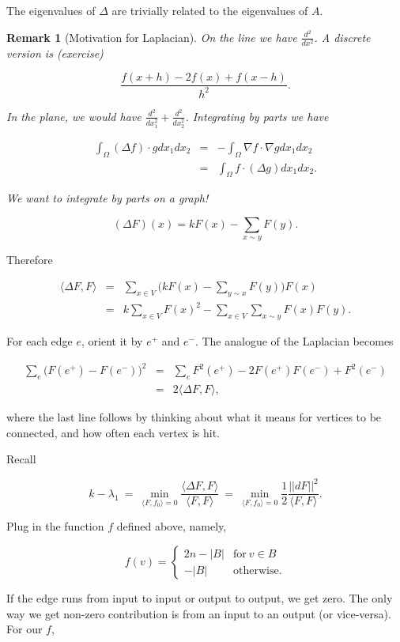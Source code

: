\documentclass[12pt,letterpaper]{report}
\newcommand\be{\begin{equation}}
\newcommand\ee{\end{equation}}
\newcommand\bea{\begin{eqnarray}}
\newcommand\eea{\end{eqnarray}}
\newcommand{\foh}{\frac{1}{2}}  %
\newtheorem{rek}[thm]{Remark}
\begin{document}
The eigenvalues of $\Delta$ are trivially related to the
eigenvalues of $A$.

\begin{rek}[Motivation for Laplacian] On the line we have
$\frac{d^2}{dx^2}$. A discrete version is (exercise)

\be \frac{ f(x+h) - 2f(x) + f(x-h) }{h^2}. \ee

In the plane, we would have $\frac{d^2}{dx_1^2} +
\frac{d^2}{dx_2^2}$. Integrating by parts we have

\bea \int_\Omega (\Delta f) \cdot g dx_1dx_2 &=& -\int_\Omega
\nabla f \cdot \nabla g dx_1dx_2 \nonumber\\ &=& \int_\Omega f
\cdot (\Delta g) dx_1dx_2. \eea

We want to integrate by parts on a graph!
\end{rek}

\be (\Delta F)(x) = kF(x) - \sum_{x \sim y} F(y). \ee

Therefore

\bea \langle \Delta F, F\rangle &=& \sum_{x\in V}\Bigg( k F(x) -
\sum_{y \sim x} F(y) \Bigg) F(x) \nonumber\\ &=& k \sum_{x \in V}
F(x)^2 - \sum_{x \in V} \sum_{x \sim y} F(x)F(y). \eea

For each edge $e$, orient it by $e^+$ and $e^-$. The analogue of
the Laplacian becomes

\bea \sum_e \Big( F(e^+) - F(e^-) \Big)^2 &=& \sum_e F^2(e^+) -
2F(e^+)F(e^-) + F^2(e^-) \nonumber\\ &=& 2 \langle \Delta F,
F\rangle, \eea

where the last line follows by thinking about what it means for
vertices to be connected, and how often each vertex is hit.

Recall

\be k - \lambda_1 \ = \ \min_{ \langle F, f_0 \rangle = 0} \frac{
\langle \Delta F, F \rangle }{\langle F, F\rangle } \ = \ \min_{
\langle F, f_0 \rangle = 0} \foh \frac{ ||dF||^2}{\langle F,
F\rangle }. \ee

Plug in the function $f$ defined above, namely,

\be f(v) = \begin{cases} 2n - |B| & \mbox{for} \ v \in B \\ -|B| &
\mbox{otherwise}.
\end{cases} \ee

If the edge runs from input to input or output to output, we get
zero. The only way we get non-zero contribution is from an input
to an output (or vice-versa). For our $f$,
\end{document}
